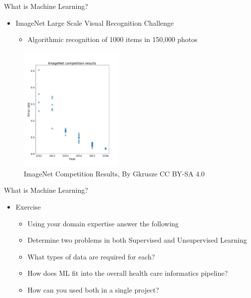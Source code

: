 \documentclass[10pt]{beamer}
\begin{document}
\begin{frame}{What is Machine Learning?}  
	\begin{itemize}
		\item ImageNet Large Scale Visual Recognition Challenge
			\begin{itemize}
				\item Algorithmic recognition of 1000 items in 150,000 photos  
			\end{itemize}
	\end{itemize}
		\begin{center}
		\begin{figure}
			\caption{ImageNet Competition Results, {\tiny By Gkrusze CC BY-SA 4.0}}
			\includegraphics[width=0.45\textwidth, center, trim=0cm 0cm 0 0cm]{images/ImageNet_error.pdf}
		\end{figure}
	\end{center}
\end{frame}

\begin{frame}{What is Machine Learning?}  
	\begin{itemize}
		\item Exercise
			\begin{itemize}
				\item Using your domain expertise answer the following
				\pause
				\item Determine two problems in both Supervised and Unsupervised Learning
				\pause
				\item What types of data are required for each?
				\pause
				\item How does ML fit into the overall health care informatics pipeline?
				\pause
				\item How can you used both in a single project?
			\end{itemize}
	\end{itemize}
\end{frame}
\end{document}
